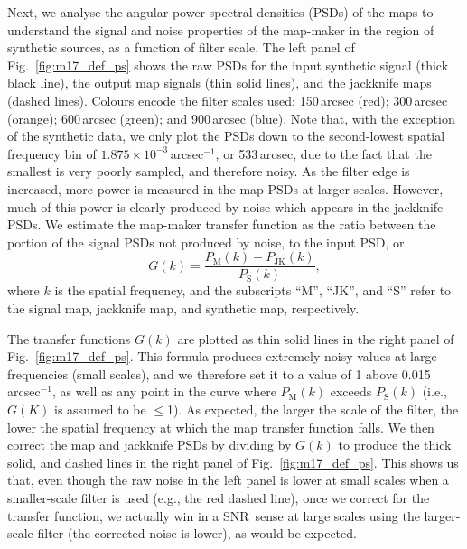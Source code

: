 \documentclass[useAMS,usenatbib,nofootinbib]{mn2e}
\newcommand{\snr}{SNR}
\begin{document}
Next, we analyse the angular power spectral densities (PSDs) of the
maps to understand the signal and noise properties of the map-maker in
the region of synthetic sources, as a function of filter scale. The
left panel of Fig.~\ref{fig:m17_def_ps} shows the raw PSDs for the
input synthetic signal (thick black line), the output map signals
(thin solid lines), and the jackknife maps (dashed lines). Colours
encode the filter scales used: 150\,arcsec (red); 300\,arcsec
(orange); 600\,arcsec (green); and 900\,arcsec (blue). Note that, with
the exception of the synthetic data, we only plot the PSDs down to the
second-lowest spatial frequency bin of
$1.875\times10^{-3}$\,arcsec$^{-1}$, or 533\,arcsec, due to the fact
that the smallest is very poorly sampled, and therefore noisy. As the
filter edge is increased, more power is measured in the map PSDs at
larger scales. However, much of this power is clearly produced by
noise which appears in the jackknife PSDs. We estimate the map-maker
transfer function as the ratio between the portion of the signal PSDs
not produced by noise, to the input PSD, or
%
\begin{equation}
G(k) = \frac{P_\mathrm{M}(k) - P_\mathrm{JK}(k)}{P_\mathrm{S}(k)},
\end{equation}
%
where $k$ is the spatial frequency, and the subscripts ``M'', ``JK'',
and ``S'' refer to the signal map, jackknife map, and synthetic map,
respectively.

The transfer functions $G(k)$ are plotted as thin solid lines in the
right panel of Fig.~\ref{fig:m17_def_ps}. This formula produces
extremely noisy values at large frequencies (small scales), and we
therefore set it to a value of 1 above 0.015\,arcsec$^{-1}$, as well
as any point in the curve where $P_\mathrm{M}(k)$ exceeds
$P_\mathrm{S}(k)$ (i.e., $G(K)$ is assumed to be $\le$1). As expected,
the larger the scale of the filter, the lower the spatial frequency at
which the map transfer function falls. We then correct the map and
jackknife PSDs by dividing by $G(k)$ to produce the thick solid, and
dashed lines in the right panel of Fig.~\ref{fig:m17_def_ps}. This
shows us that, even though the raw noise in the left panel is lower at
small scales when a smaller-scale filter is used (e.g., the red dashed
line), once we correct for the transfer function, we actually win in a
\snr\ sense at large scales using the larger-scale filter (the
corrected noise is lower), as would be expected.
\end{document}
